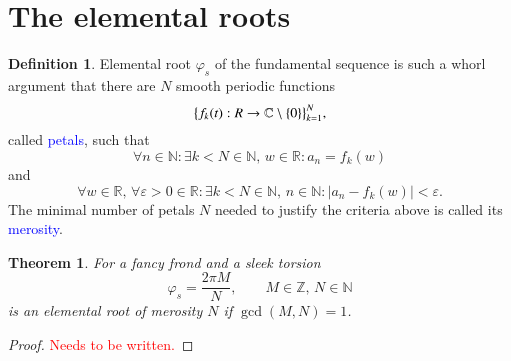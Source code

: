 \documentclass{article}
\newcommand{\red}[1]{\textcolor{red}{#1}}
\newcommand{\blue}[1]{\textcolor{blue}{#1}}
\theoremstyle{plain}
\newtheorem{theorem}{Theorem}[section]
\theoremstyle{definition}
\newtheorem{definition}{Definition}[section]
\newcommand{\cmz}{\mathbb C \setminus \{0\} }
\begin{document}
\section{The elemental roots}
\begin{definition}
Elemental root $\varphi_s$ of the fundamental sequence is such a whorl argument that there are $N$ smooth periodic functions 
$$ \big\{f_k(t): \mathbb \mathbb R \rightarrow \cmz\big\}_{k=1}^N 
,$$ called \blue{petals}, such that $$
\forall n \in \mathbb N: \exists k<N \in \mathbb N,\,w \in \mathbb R: a_n = f_k(w) 
$$ and $$
\forall w \in \mathbb R,\, \forall \varepsilon >0  \in \mathbb R: \exists k<N \in \mathbb N,\, n \in \mathbb N: |a_n - f_k(w)|<\varepsilon
.$$
The minimal number of petals $N$ needed to justify the criteria above is called its \blue{merosity}.  	
\end{definition}

\begin{theorem}
For a fancy frond and a sleek torsion $$\varphi_s = \frac{2\pi M}N, \qquad M \in \mathbb Z,\, N \in\mathbb N $$ is an elemental root of merosity $N$ if $\gcd(M,N)=1$.
\end{theorem}
\begin{proof}
\red{Needs to be written.}
\end{proof}
\end{document}
